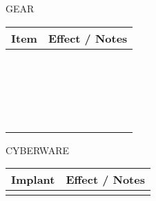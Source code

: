 \begin{dossier}

\begin{minipage}[b][\textheight][t]{8cm}
\begin{dossierbox}{8cm}{15cm}{GEAR}
\begin{adjustwidth*}{0cm}{.2cm}
\vspace{-.1cm}
\begin{tabu}{p{2cm}|p{5.5cm}}
\rowfont{\oswaldfont\fontsize{16pt}{0em}\selectfont}
Item & Effect / Notes\\
\hline\\[.20cm]
\hline\\[.20cm]
\hline\\[.20cm]
\hline\\[.20cm]
\hline\\[.20cm]
\hline\\[.20cm]
\hline\\[.20cm]
\hline\\[.20cm]
\hline\\[.20cm]
\hline\\[.20cm]
\hline\\[.20cm]
\hline\\[.20cm]
\hline\\[.20cm]
\hline\\[.20cm]
\hline\\[.20cm]
\hline\\[.20cm]
\hline\\[.20cm]
\hline\\[.20cm]
\hline\\[.20cm]
\hline\\[.20cm]
\hline
\end{tabu}
\end{adjustwidth*}
\end{dossierbox}
\end{minipage}
\hspace{.65cm}%
\vrule width 2pt
\hspace{.3cm}%
\begin{minipage}[b][\textheight][t]{17cm}
\begin{dossierbox}{8cm}{12.2cm}{CYBERWARE}
\begin{adjustwidth*}{0cm}{.2cm}
\vspace{-.1cm}
\begin{tabu}{p{2cm}|p{5.5cm}}
\rowfont{\oswaldfont\fontsize{16pt}{0em}\selectfont}
Implant & Effect / Notes\\
\hline\\[.20cm]

\end{tabu}
\end{adjustwidth*}
\end{dossierbox}
\end{minipage}
\end{dossier}
